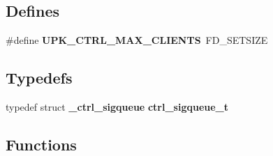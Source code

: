\subsection*{Defines}
\begin{DoxyCompactItemize}
\item 
\#define {\bf UPK\_\-CTRL\_\-MAX\_\-CLIENTS}~FD\_\-SETSIZE
\end{DoxyCompactItemize}
\subsection*{Typedefs}
\begin{DoxyCompactItemize}
\item 
typedef struct {\bf \_\-ctrl\_\-sigqueue} {\bf ctrl\_\-sigqueue\_\-t}
\end{DoxyCompactItemize}
\subsection*{Functions}

